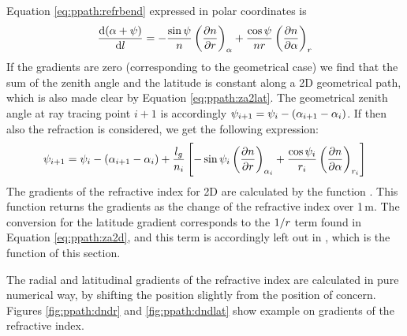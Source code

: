 Equation \ref{eq:ppath:refrbend} expressed in polar coordinates
is \citep[Eq. 9.30]{rodgers:00}
\begin{equation}
  \frac{\mathrm{d}(\alpha+\psi)}{\mathrm{d} l} = 
    -\frac{\sin\psi}{n} \left( \frac{\partial n}{\partial r} \right)_{\alpha}
    +\frac{\cos\psi}{nr} \left( \frac{\partial n}{\partial \alpha} \right)_{r}
  \label{eq:ppath:refrbend2d}
\end{equation}
If the gradients are zero (corresponding to the geometrical case) we
find that the sum of the zenith angle and the latitude is constant
along a 2D geometrical path, which is also made clear by
Equation \ref{eq:ppath:za2lat}. The geometrical zenith angle at ray
tracing point $i+1$ is accordingly $\psi_{i+1} = \psi_{i} -
(\alpha_{i+1}-\alpha_{i})$. If then also the refraction is considered, we
get the following expression:
\begin{equation}
  \psi_{i+1} = \psi_{i} - (\alpha_{i+1}-\alpha_{i}) + \frac{l_g}{n_i}
   \left[
    -\sin\psi_{i} \left( \frac{\partial n}{\partial r} \right)_{\alpha_{i}}
    +\frac{\cos\psi_{i}}{r_{i}} 
                \left( \frac{\partial n}{\partial \alpha} \right)_{r_{i}}
  \right]  
  \label{eq:ppath:za2d}
\end{equation}
The gradients of the refractive index for 2D are calculated by the
function . This function returns the
gradients as the change of the refractive index over 1\,m. The
conversion for the latitude gradient corresponds to the $1/r$ term
found in Equation \ref{eq:ppath:za2d}, and this term is accordingly
left out in , which is the
function of this section. 

The radial and latitudinal gradients of the refractive index are
calculated in pure numerical way, by shifting the position slightly
from the position of concern. Figures \ref{fig:ppath:dndr} and
\ref{fig:ppath:dndlat} show example on gradients of the refractive
index.




